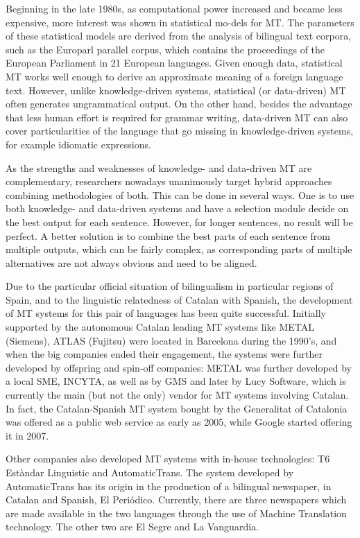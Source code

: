 \begin{multicols}{2}
Beginning in the late 1980s, as computational power increased and became less expensive, more interest was shown in statistical mo-dels for MT. The parameters of these statistical models are derived from the analysis of bilingual text corpora, such as the Europarl parallel corpus, which contains the proceedings of the European Parliament in 21 European languages. Given enough data, statistical MT works well enough to derive an approximate meaning of a foreign language text. However, unlike knowledge-driven systems, statistical (or data-driven) MT often generates ungrammatical output. On the other hand, besides the advantage that less human effort is required for grammar writing, data-driven MT can also cover particularities of the language that go missing in knowledge-driven systems, for example idiomatic expressions. 

As the strengths and weaknesses of knowledge- and data-driven MT are complementary, researchers nowadays unanimously target hybrid approaches combining methodologies of both. This can be done in several ways. One is to use both knowledge- and data-driven systems and have a selection module decide on the best output for each sentence. However, for longer sentences, no result will be perfect. A better solution is to combine the best parts of each sentence from multiple outputs, which can be fairly complex, as corresponding parts of multiple alternatives are not always obvious and need to be aligned. 

Due to the particular official situation of bilingualism in particular regions of Spain, and to the linguistic relatedness of Catalan with Spanish, the development of MT systems for this pair of languages has been quite successful. Initially supported by the autonomous Catalan leading MT systems like METAL (Siemens), ATLAS (Fujitsu) were located in Barcelona during the 1990’s, and when the big companies ended their engagement, the systems were further developed by offspring and spin-off companies: METAL was further developed by a local SME, INCYTA, as well as by GMS and later by Lucy Software, which is currently the main (but not the only) vendor for MT systems involving Catalan. In fact, the Catalan-Spanish MT system  bought by the Generalitat of Catalonia was offered as a public web service as early as 2005, while Google started offering it in 2007. 

Other companies also developed MT systems with in-house technologies: T6 Estàndar Linguistic and AutomaticTrans. The system developed by AutomaticTrans has its origin in the production of a bilingual newspaper, in Catalan and Spanish, El Periódico. Currently, there are three newspapers which are made available in the two languages  through the use of Machine Translation technology. The other two are El Segre and La Vanguardia. 


\end{multicols}
